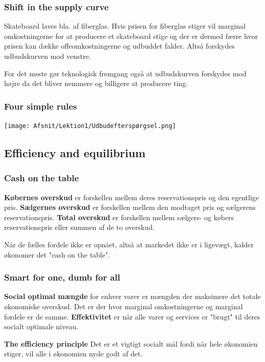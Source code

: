 \subsubsection{Shift in the supply curve}
\begin{eks} \textbf{} %
\newline
Skateboard laves bla. af fiberglas. Hvis prisen for fiberglas stiger vil marginal omkostningerne for at producere et skateboard stige og der er dermed færre hvor prisen kan dække offeomkostningerne og udbuddet falder. Altså forskydes udbudskurven mod venstre. 
\end{eks}

For det meste gør teknologisk fremgang også at udbudskurven forskydes mod højre da det bliver nemmere og billigere at producere ting. 

\subsubsection{Four simple rules}
\texttt{[image: Afsnit/Lektion1/Udbudefterspørgsel.png]}

\subsection{Efficiency and equilibrium}
\subsubsection{Cash on the table}
\textbf{Købernes overskud} er forskellen mellem deres reservationspris og den egentlige pris. \textbf{Sælgernes overskud} er forskellen mellem den modtaget pris og sælgerens reservationspris. \textbf{Total overskud} er forskellen mellem sælgers- og købers reservationspris eller summen af de to overskud. 

Når de fælles fordele ikke er opnået, altså at markedet ikke er i ligevægt, kalder økonomer det "cash on the table". 

\subsubsection{Smart for one, dumb for all}
\textbf{Social optimal mængde} for enhver varer er mængden der maksimere det totale økonomiske overskud. Det er der hvor marginal omkostningerne og marginal fordele er de samme. \textbf{Effektivitet} er når alle varer og services er "brugt" til deres socialt optimale niveau. 

\begin{defn}\textbf{The efficiency principle} %
\newline Det er et vigtigt socialt mål fordi når hele økonomien stiger, vil alle i økonomien nyde godt af det. 
\end{defn}

